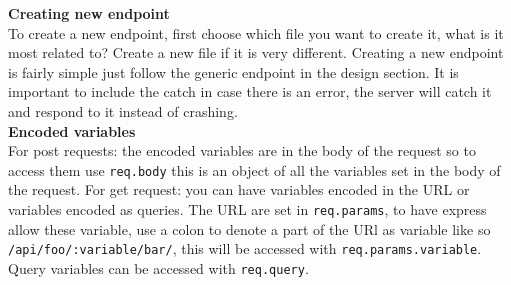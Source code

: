 \documentclass[12pt]{article}
\begin{document}
\noindent
\textbf{Creating new endpoint}\\
\noindent
To create a new endpoint, first choose which file you want to create it, what is it most related to? Create a new file if it is very different. Creating a new endpoint is fairly simple just follow the generic endpoint in the design section. It is important to include the catch in case there is an error, the server will catch it and respond to it instead of crashing.\\
\noindent
\textbf{Encoded variables}\\
\noindent
For post requests: the encoded variables are in the body of the request so to access them use \lstinline"req.body" this is an object of all the variables set in the body of the request. For get request: you can have variables encoded in the URL or variables encoded as queries. The URL are set in \lstinline"req.params", to have express allow these variable, use a colon to denote a part of the URl as variable like so \lstinline"/api/foo/:variable/bar/", this will be accessed with \lstinline"req.params.variable". Query variables can be accessed with \lstinline"req.query".
\end{document}
